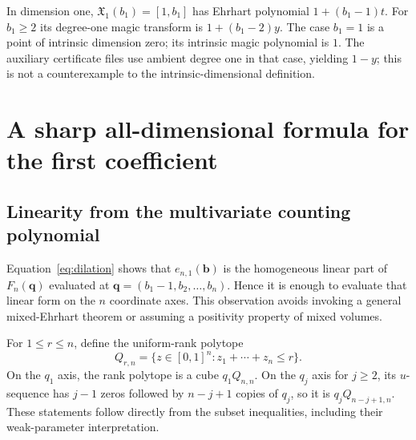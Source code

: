 \documentclass[11pt]{article}
\theoremstyle{definition}
\newcommand{\bb}{\mathbf b}
\newcommand{\qq}{\mathbf q}
\newcommand{\X}{\mathfrak X}
\numberwithin{equation}{section}
\begin{document}
In dimension one, $\X_1(b_1)=[1,b_1]$ has Ehrhart polynomial
$1+(b_1-1)t$. For $b_1\ge2$ its degree-one magic transform is
$1+(b_1-2)y$. The case $b_1=1$ is a point of intrinsic dimension zero;
its intrinsic magic polynomial is $1$. The auxiliary certificate files
use ambient degree one in that case, yielding $1-y$; this is not a
counterexample to the intrinsic-dimensional definition.

\section{A sharp all-dimensional formula for the first coefficient}
\label{sec:first}

\subsection{Linearity from the multivariate counting polynomial}
Equation~\eqref{eq:dilation} shows that $e_{n,1}(\bb)$ is the homogeneous
linear part of $F_n(\qq)$ evaluated at
$\qq=(b_1-1,b_2,\ldots,b_n)$. Hence it is enough to evaluate that linear
form on the $n$ coordinate axes. This observation avoids invoking a general
mixed-Ehrhart theorem or assuming a positivity property of mixed volumes.

For $1\le r\le n$, define the uniform-rank polytope
\begin{equation}
 Q_{r,n}=\{z\in[0,1]^n:z_1+\cdots+z_n\le r\}.
 \label{eq:uniform}
\end{equation}
On the $q_1$ axis, the rank polytope is a cube $q_1Q_{n,n}$. On the
$q_j$ axis for $j\ge2$, its $u$-sequence has $j-1$ zeros followed by
$n-j+1$ copies of $q_j$, so it is $q_jQ_{n-j+1,n}$.
These statements follow directly from the subset inequalities, including
their weak-parameter interpretation.
\end{document}

